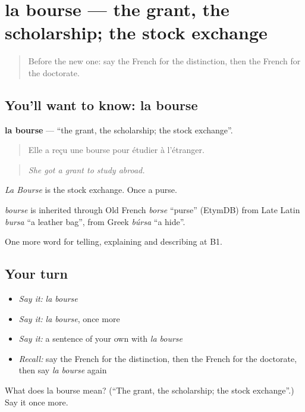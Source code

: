 \section[la bourse]{la bourse — the grant, the scholarship; the stock exchange}

\label{lesson:FR-C379-bourse}



\begin{quote}
Before the new one: say the French for the distinction, then the French for the doctorate.
\end{quote}

\subsection*{You'll want to know: la bourse}
\textbf{la bourse} — \textquotedblleft{}the grant, the scholarship; the stock exchange\textquotedblright{}.

\begin{quote}
Elle a reçu une bourse pour étudier à l'étranger.
\end{quote}

\begin{quote}
\emph{She got a grant to study abroad.}
\end{quote}

\emph{La Bourse} is the stock exchange. Once a purse.

\begin{cousinweb}
\emph{bourse} is inherited through Old French \emph{borse} \textquotedblleft{}purse\textquotedblright{} (EtymDB) from Late Latin \emph{bursa} \textquotedblleft{}a leather bag\textquotedblright{}, from Greek \emph{búrsa} \textquotedblleft{}a hide\textquotedblright{}.
\end{cousinweb}

\begin{grammarlens}[title={What you've built}]
One more word for telling, explaining and describing at B1.
\end{grammarlens}

\subsection*{Your turn}
\begin{itemize}
\raggedright
  \item \emph{Say it:} \emph{la bourse}
  \item \emph{Say it:} \emph{la bourse}, once more
  \item \emph{Say it:} a sentence of your own with \emph{la bourse}
  \item \emph{Recall:} say the French for the distinction, then the French for the doctorate, then say \emph{la bourse} again
\end{itemize}

\begin{tcolorbox}[breakable,colback=teal!4,colframe=teal!35!black,title={Before you move on}]
What does la bourse mean? (\textquotedblleft{}The grant, the scholarship; the stock exchange\textquotedblright{}.) Say it once more.
\end{tcolorbox}
